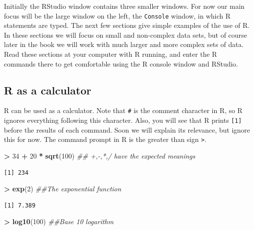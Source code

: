 \documentclass[]{krantz}
\makeatletter
\newenvironment{Shaded}{\begin{snugshade}}{\end{snugshade}}
\newcommand{\CommentTok}[1]{\textcolor[rgb]{0.37,0.37,0.37}{\textit{#1}}}
\newcommand{\DecValTok}[1]{\textcolor[rgb]{0.06,0.06,0.06}{#1}}
\newcommand{\KeywordTok}[1]{\textcolor[rgb]{0.27,0.27,0.27}{\textbf{#1}}}
\newcommand{\NormalTok}[1]{#1}
\newcommand{\OperatorTok}[1]{\textcolor[rgb]{0.43,0.43,0.43}{\textbf{#1}}}
\newcommand{\StringTok}[1]{\textcolor[rgb]{0.5,0.5,0.5}{#1}}
\newenvironment{kframe}{%
\medskip{}
\setlength{\fboxsep}{.8em}
 \def\at@end@of@kframe{}%
 \ifinner\ifhmode%
  \def\at@end@of@kframe{\end{minipage}}%
  \begin{minipage}{\columnwidth}%
 \fi\fi%
 \def\FrameCommand##1{\hskip\@totalleftmargin \hskip-\fboxsep
 \colorbox{shadecolor}{##1}\hskip-\fboxsep
     \hskip-\linewidth \hskip-\@totalleftmargin \hskip\columnwidth}%
 \MakeFramed {\advance\hsize-\width
   \@totalleftmargin\z@ \linewidth\hsize
   \@setminipage}}%
 {\par\unskip\endMakeFramed%
 \at@end@of@kframe}
\renewenvironment{Shaded}{\begin{kframe}}{\end{kframe}}
\makeatother
\begin{document}
Initially the RStudio window contains three smaller windows. For now our main focus will be the large window on the left, the \texttt{Console} window, in which R statements are typed. The next few sections give simple examples of the use of R. In these sections we will focus on small and non-complex data sets, but of course later in the book we will work with much larger and more complex sets of data. Read these sections at your computer with R running, and enter the R commands there to get comfortable using the R console window and RStudio.

\hypertarget{r-as-a-calculator}{%
\subsection{R as a calculator}\label{r-as-a-calculator}}

R can be used as a calculator. Note that \texttt{\#} is the comment character in R, so R ignores everything following this character. Also, you will see that R prints \texttt{{[}1{]}} before the results of each command. Soon we will explain its relevance, but ignore this for now. The command prompt in R is the greater than sign \texttt{\textgreater{}}.

\begin{Shaded}
\begin{Highlighting}[]
\OperatorTok{>}\StringTok{ }\DecValTok{34} \OperatorTok{+}\StringTok{ }\DecValTok{20} \OperatorTok{*}\StringTok{ }\KeywordTok{sqrt}\NormalTok{(}\DecValTok{100}\NormalTok{)  }\CommentTok{## +,-,*,/ have the expected meanings}
\end{Highlighting}
\end{Shaded}

\begin{verbatim}
[1] 234
\end{verbatim}

\begin{Shaded}
\begin{Highlighting}[]
\OperatorTok{>}\StringTok{ }\KeywordTok{exp}\NormalTok{(}\DecValTok{2}\NormalTok{)  }\CommentTok{##The exponential function}
\end{Highlighting}
\end{Shaded}

\begin{verbatim}
[1] 7.389
\end{verbatim}

\begin{Shaded}
\begin{Highlighting}[]
\OperatorTok{>}\StringTok{ }\KeywordTok{log10}\NormalTok{(}\DecValTok{100}\NormalTok{)  }\CommentTok{##Base 10 logarithm}
\end{Highlighting}
\end{Shaded}
\end{document}
